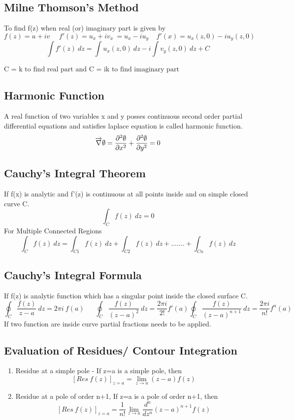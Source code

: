 \subsection*{Milne Thomson's Method}
To find f(z) when real (or) imaginary part is given by
\[f(z)=u+iv\ \ \ \ \ \ f'(z)=u_x+iv_x\ = u_x - iu_y\ \ \ \ \ f'(x) = u_x(z,0)-iu_y(z,0)\]
\[\int f'(z)\ dz=\int u_x(z,0)\ dz-i\int v_y(z,0)\ dz + C\]
\begin{fleqn}
\(\text{C = k to find real part and C = ik to find imaginary part}\)
\end{fleqn}

\subsection*{Harmonic Function}
A real function of two variables x and y posses continuous second order partial differential equations and satisfies laplace equation is called harmonic function.
\[\overrightarrow{\rm \nabla}\emptyset=\frac{\partial^2\emptyset}{\partial x^2}+\frac{\partial^2\emptyset}{\partial y^2}=0\]


\subsection{Cauchy's Integral Theorem}
If f(x) is analytic and f'(z) is continuous at all points inside and on simple closed curve C.
\[\int_C f(z)\ dz=0\]
For Multiple Connected Regions
\[\int_C f(z)\ dz= \int_{C1}f(z)\ dz+\int_{C2}f(z)\ dz+\ldots\ldots.+\int_{Cn}f(z)\ dz\]

\subsection{Cauchy's Integral Formula}
If f(z) is analytic function which has a singular point inside the closed surface C.
\[\oint_C \frac{f(z)}{z-a}\ dz=2\pi i\ f(a)\ \ \ \ \ \ \ \oint_C\frac{f(z)}{(z-a)^2}\ dz= \frac{2 \pi i}{2!}f'(a) \oint_C\frac{f(z)}{(z-a)^{n+1}}\ dz= \frac{2 \pi i}{n!}f^n(a)\]
If two function are inside curve partial fractions needs to be applied.

\subsection{Evaluation of Residues/ Contour Integration}
\begin{enumerate}
    \item Residue at a simple pole - If z=a is a simple pole, then
    \[[Res\ f(z)]_{z=a}=\lim_{z \to a}(z-a)f(z)\]
    \item Residue at a pole of order n+1, If z=a is a pole of order n+1, then
    \[[Res\ f(z)]_{z=a}=\frac{1}{n!}\lim_{z \to a}\frac{d^n}{dz^n}(z-a)^{n+1}f(z)\]
\end{enumerate}

